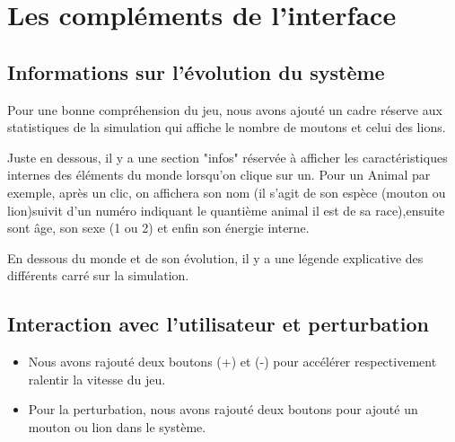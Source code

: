 \documentclass[a4paper,12pt]{article} %
\begin{document}
\section{Les compléments de l'interface}
\subsection{Informations sur l'évolution du système}
Pour une bonne compréhension du jeu, nous avons ajouté un cadre réserve aux statistiques de la simulation qui affiche le nombre de moutons et celui des lions.

Juste en dessous, il y a une section  "infos" réservée à afficher les caractéristiques internes des éléments du monde lorsqu'on clique sur un.
Pour un Animal par exemple, après un clic, on affichera son nom (il s'agit de son espèce (mouton ou lion)suivit d'un numéro indiquant le quantième animal il est de sa race),ensuite sont âge, son sexe (1 ou 2) et enfin son énergie interne.

En dessous du monde et de son évolution, il y a une légende explicative des différents carré sur la simulation.

\subsection{Interaction avec l'utilisateur et perturbation}
\begin{itemize}
    \item Nous avons rajouté deux boutons (+) et (-) pour accélérer respectivement ralentir la vitesse du jeu.
    \item Pour la perturbation, nous avons rajouté deux boutons pour ajouté un mouton ou lion dans le système.
\end{itemize}
\end{document}
